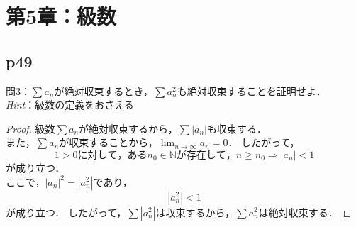 \documentclass[dvipdfmx,uplatex,11pt]{jsarticle}
\begin{document}
%
%
%
\section{第5章：級数}
\subsection{p49}
\noindent
問3：$\sum a_n$が絶対収束するとき，$\sum a_n ^2$も絶対収束することを証明せよ．
\\
\textsl{Hint}：級数の定義をおさえる\\
\dotfill

\begin{leftbar}
\begin{proof}

級数$\sum a_n$が絶対収束するから，$\sum |a_n|$も収束する．\\
また，$\sum a_n$が収束することから，$\displaystyle \lim_{n \to \infty} a_n=0$．
したがって，
\[
1>0に対して，あるn_0 \in \mathbb{N}が存在して，n \ge n_0 \Rightarrow |a_n|<1
\]
が成り立つ．\\
ここで，$|a_n|^2=|a_n ^2|$であり，\\
\[ |a_n ^2| <1 \]
が成り立つ．
したがって，$\sum |a_n ^2|$は収束するから，$\sum a_n ^2$は絶対収束する．
\end{proof}
\end{leftbar}
\end{document}

